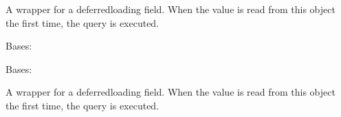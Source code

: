 \documentclass[letterpaper,10pt,english]{sphinxmanual}
\begin{document}
\begin{fulllineitems}
\begin{fulllineitems}
\label{\detokenize{index:bookings.models.SupplementPrice.visitor_price_with_swimming_pool}}
\pysigstartsignatures
\pysigline
{}
\pysigstopsignatures
\sphinxAtStartPar
A wrapper for a deferred\sphinxhyphen{}loading field. When the value is read from this
object the first time, the query is executed.

\end{fulllineitems}


\begin{fulllineitems}
\label{\detokenize{index:bookings.models.SupplementPrice.DoesNotExist}}
\pysigstartsignatures
\pysigline
{}
\pysigstopsignatures
\sphinxAtStartPar
Bases: 

\end{fulllineitems}


\begin{fulllineitems}
\label{\detokenize{index:bookings.models.SupplementPrice.MultipleObjectsReturned}}
\pysigstartsignatures
\pysigline
{}
\pysigstopsignatures
\sphinxAtStartPar
Bases: 

\end{fulllineitems}


\begin{fulllineitems}
\label{\detokenize{index:bookings.models.SupplementPrice.id}}
\pysigstartsignatures
\pysigline
{}
\pysigstopsignatures
\sphinxAtStartPar
A wrapper for a deferred\sphinxhyphen{}loading field. When the value is read from this
object the first time, the query is executed.

\end{fulllineitems}


\end{fulllineitems}
\end{document}
